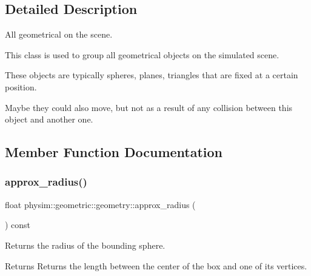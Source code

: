 \subsection{Detailed Description}
All geometrical on the scene. 

This class is used to group all geometrical objects on the simulated scene.

These objects are typically spheres, planes, triangles that are fixed at a certain position.

Maybe they could also move, but not as a result of any collision between this object and another one. 

\subsection{Member Function Documentation}
\mbox{\label{classphysim_1_1geometric_1_1geometry_a570de2d1faf50b787ec2f72703c41e19}} 
\subsubsection{\texorpdfstring{approx\+\_\+radius()}{approx\_radius()}}
{\footnotesize\ttfamily float physim\+::geometric\+::geometry\+::approx\+\_\+radius (\begin{DoxyParamCaption}{ }\end{DoxyParamCaption}) const}



Returns the radius of the bounding sphere. 

\begin{DoxyReturn}{Returns}
Returns the length between the center of the box and one of its vertices. 
\end{DoxyReturn}
\mbox{\label{classphysim_1_1geometric_1_1geometry_a63d63c340937cede50a95903679c5ad3}} 
